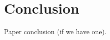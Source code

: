 \documentclass{sigchi}
\begin{document}
%
% 
% 

\section{Conclusion}
Paper conclusion (if we have one).

%
%
%
%
%
\balance



\end{document}
